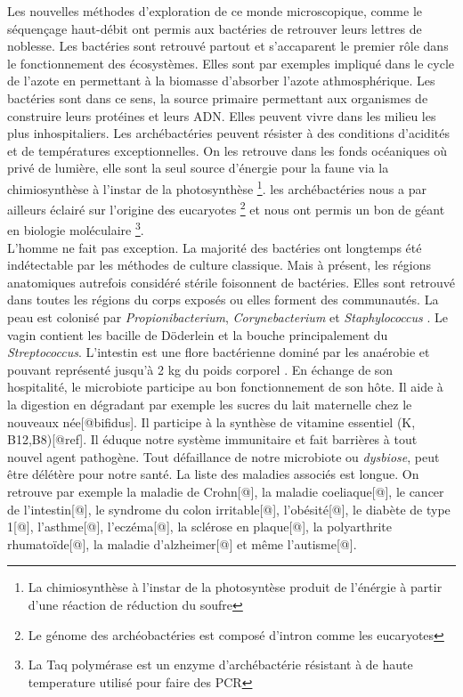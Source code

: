 \documentclass[12pt,a4paper]{article}
\begin{document}
Les nouvelles méthodes d'exploration de ce monde microscopique, comme le séquençage haut-débit ont permis aux bactéries de retrouver leurs lettres de noblesse.
Les bactéries sont retrouvé partout et s'accaparent le premier rôle dans le fonctionnement des écosystèmes. Elles sont par exemples impliqué dans le cycle de l'azote en permettant à la biomasse d'absorber l'azote athmosphérique. Les bactéries sont dans ce sens, la source primaire permettant aux organismes de construire leurs protéines et leurs ADN.
Elles peuvent vivre dans les milieu les plus inhospitaliers. Les archébactéries peuvent résister à des conditions d'acidités et de températures exceptionnelles. On les retrouve dans les fonds océaniques où privé de lumière, elle sont la seul source d'énergie pour la faune via la chimiosynthèse à l'instar de la photosynthèse \footnote{La chimiosynthèse à l'instar de la photosyntèse produit de l'énérgie à partir d'une réaction de réduction du soufre}. les archébactéries nous a par ailleurs éclairé sur l’origine des eucaryotes \footnote{Le génome des archéobactéries est composé d'intron comme les eucaryotes} et nous ont permis un bon de géant en biologie moléculaire \footnote{La Taq polymérase est un enzyme d'archébactérie résistant à de haute temperature utilisé pour faire des PCR}.\\
L'homme ne fait pas exception. La majorité des bactéries ont longtemps été indétectable par les méthodes de culture classique. Mais à présent, les régions anatomiques autrefois considéré stérile foisonnent de bactéries. 
Elles sont retrouvé dans toutes les régions du corps exposés ou elles forment des communautés.
La peau est colonisé par \textit{Propionibacterium}, \textit{Corynebacterium} et \textit{Staphylococcus} \citep{Beck}. Le vagin contient les bacille de Döderlein et la bouche principalement du \textit{Streptococcus}\cite{Beck}.
L'intestin est une flore bactérienne dominé par les anaérobie et pouvant représenté jusqu'à 2 kg du poids corporel \citep{Beck}.
En échange de son hospitalité, le microbiote participe au bon fonctionnement de son hôte. Il aide à la digestion en dégradant par exemple les sucres du lait maternelle chez le nouveaux née[@bifidus]. Il participe à la synthèse de vitamine essentiel (K, B12,B8)[@ref]. Il éduque notre système immunitaire et fait barrières à tout nouvel agent pathogène.
Tout défaillance de notre microbiote ou \textit{dysbiose}, peut être délétère pour notre santé. La liste des maladies associés est longue. On retrouve par exemple la maladie de Crohn[@], la maladie coeliaque[@], le cancer de l’intestin[@], le syndrome du colon irritable[@], l’obésité[@], le diabète de type 1[@], l’asthme[@], l’eczéma[@], la sclérose en plaque[@], la polyarthrite rhumatoïde[@], la maladie d’alzheimer[@] et même l’autisme[@]. \\
\end{document}
